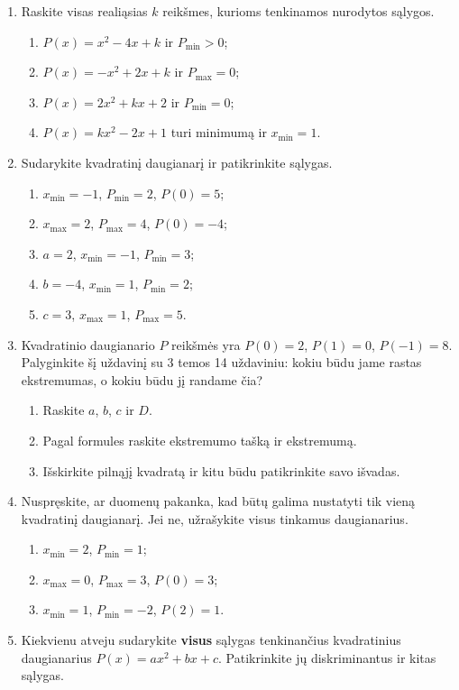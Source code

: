 \documentclass[12pt,a4paper]{article}
\begin{document}
\begin{enumerate}
\item Raskite visas realiąsias $k$ reikšmes, kurioms tenkinamos nurodytos sąlygos.
\begin{enumerate}
\item $P(x)=x^2-4x+k$ ir $P_{\min}>0$;
\item $P(x)=-x^2+2x+k$ ir $P_{\max}=0$;
\item $P(x)=2x^2+kx+2$ ir $P_{\min}=0$;
\item $P(x)=kx^2-2x+1$ turi minimumą ir $x_{\min}=1$.
\end{enumerate}
\item Sudarykite kvadratinį daugianarį ir patikrinkite sąlygas.
\begin{enumerate}
\item $x_{\min}=-1$, $P_{\min}=2$, $P(0)=5$;
\item $x_{\max}=2$, $P_{\max}=4$, $P(0)=-4$;
\item $a=2$, $x_{\min}=-1$, $P_{\min}=3$;
\item $b=-4$, $x_{\min}=1$, $P_{\min}=2$;
\item $c=3$, $x_{\max}=1$, $P_{\max}=5$.
\end{enumerate}
\item Kvadratinio daugianario $P$ reikšmės yra $P(0)=2$, $P(1)=0$, $P(-1)=8$. Palyginkite šį uždavinį su 3 temos 14 uždaviniu: kokiu būdu jame rastas ekstremumas, o kokiu būdu jį randame čia?
\begin{enumerate}
\item Raskite $a$, $b$, $c$ ir $D$.
\item Pagal formules raskite ekstremumo tašką ir ekstremumą.
\item Išskirkite pilnąjį kvadratą ir kitu būdu patikrinkite savo išvadas.
\end{enumerate}
\item Nuspręskite, ar duomenų pakanka, kad būtų galima nustatyti tik vieną kvadratinį daugianarį. Jei ne, užrašykite visus tinkamus daugianarius.
\begin{enumerate}
\item $x_{\min}=2$, $P_{\min}=1$;
\item $x_{\max}=0$, $P_{\max}=3$, $P(0)=3$;
\item $x_{\min}=1$, $P_{\min}=-2$, $P(2)=1$.
\end{enumerate}
\item Kiekvienu atveju sudarykite \textbf{visus} sąlygas tenkinančius kvadratinius daugianarius $P(x)=ax^2+bx+c$. Patikrinkite jų diskriminantus ir kitas sąlygas.
\begin{enumerate}

\end{enumerate}
\end{enumerate}
\end{document}
